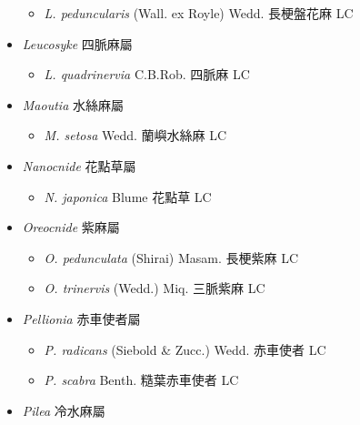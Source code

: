 \begin{itemize}
  \begin{itemize}
        \item[] \textit{L. peduncularis} (Wall. ex Royle) Wedd.  長梗盤花麻   LC
  \end{itemize}
 \item[] \textit{Leucosyke} 四脈麻屬
                                
  \begin{itemize}
        \item[] \textit{L. quadrinervia} C.B.Rob.  四脈麻   LC
  \end{itemize}
 \item[] \textit{Maoutia} 水絲麻屬
                                
  \begin{itemize}
        \item[] \textit{M. setosa} Wedd.  蘭嶼水絲麻   LC
  \end{itemize}
 \item[] \textit{Nanocnide} 花點草屬
                                
  \begin{itemize}
        \item[] \textit{N. japonica} Blume  花點草   LC
  \end{itemize}
 \item[] \textit{Oreocnide} 紫麻屬
                                
  \begin{itemize}
        \item[] \textit{O. pedunculata} (Shirai) Masam.  長梗紫麻   LC
        \item[] \textit{O. trinervis} (Wedd.) Miq.  三脈紫麻   LC
  \end{itemize}
 \item[] \textit{Pellionia} 赤車使者屬
                                
  \begin{itemize}
        \item[] \textit{P. radicans} (Siebold \& Zucc.) Wedd.  赤車使者   LC
        \item[] \textit{P. scabra} Benth.  糙葉赤車使者   LC
  \end{itemize}
 \item[] \textit{Pilea} 冷水麻屬
                                

\end{itemize}
